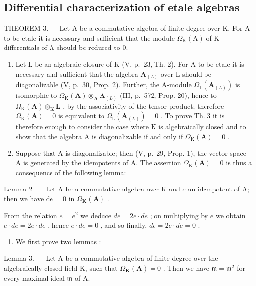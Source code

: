 \subsection{Differential characterization of etale algebras}

THEOREM 3. --- Let A be a commutative algebra of finite degree over K. For A to be etale it is necessary and sufficient that the module \(\Omega_{\mathrm{K}}(\mathrm{A})\) of K-differentials of A should be reduced to 0.

\begin{enumerate}
\def\labelenumi{\Alph{enumi})}
\item
  Let L be an algebraic closure of K (V, p.~23, Th. 2). For A to be etale it is necessary and sufficient that the algebra \(\mathbf{A}_{(L)}\) over L should be diagonalizable (V, p.~30, Prop. 2). Further, the A-module \(\Omega_{\mathrm{L}}(\mathbf{A}_{(L)})\) is isomorphic to \(\Omega_{\mathrm{K}}(\mathbf{A}) \otimes_{\mathbf{A}} \mathbf{A}_{(L)}\) (III, p.~572, Prop. 20), hence to \(\Omega_{\mathrm{K}}(\mathbf{A}) \otimes_{\mathbf{K}} \mathbf{L}\) , by the associativity of the tensor product; therefore \(\Omega_{\mathrm{K}}(\mathbf{A}) = 0\) is equivalent to \(\Omega_{\mathrm{L}}(\mathbf{A}_{(L)}) = 0\) . To prove Th. 3 it is therefore enough to consider the case where K is algebraically closed and to show that the algebra A is diagonalizable if and only if \(\Omega_{\mathrm{K}}(\mathbf{A}) = 0\) .
\item
  Suppose that A is diagonalizable; then (V, p.~29, Prop. 1), the vector space A is generated by the idempotents of A. The assertion \(\Omega_{\mathrm{K}}(\mathbf{A}) = 0\) is thus a consequence of the following lemma:
\end{enumerate}

Lemma 2. --- Let A be a commutative algebra over K and e an idempotent of A; then we have de = 0 in \(\Omega_{\mathbf{K}}(\mathbf{A})\) .

From the relation \(e = e^2\) we deduce \(de = 2e \cdot de\) ; on multiplying by \(e\) we obtain \(e \cdot de = 2e \cdot de\) , hence \(e \cdot de = 0\) , and so finally, \(de = 2e \cdot de = 0\) .

\begin{enumerate}
\def\labelenumi{\Alph{enumi})}
\setcounter{enumi}{2}
\tightlist
\item
  We first prove two lemmas :
\end{enumerate}

Lemma 3. --- Let A be a commutative algebra of finite degree over the algebraically closed field K, such that \(\Omega_{\mathbf{K}}(\mathbf{A}) = 0\) . Then we have \(\mathfrak{m} = \mathfrak{m}^2\) for every maximal ideal \(\mathfrak{m}\) of A.

